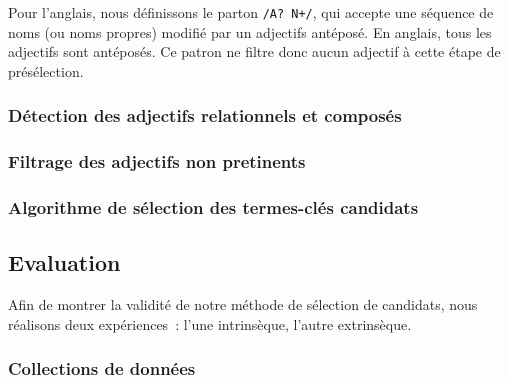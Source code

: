         Pour l'anglais, nous définissons le parton \texttt{/A? N+/}, qui
        accepte une séquence de noms (ou noms propres) modifié par un adjectifs
        antéposé. En anglais, tous les adjectifs sont antéposés. Ce patron ne
        filtre donc aucun adjectif à cette étape de présélection.

      \subsubsection{Détection des adjectifs relationnels et composés}
      \label{subsubsec:main-automatic_keyphrase_annotation-keyphrase_candidate_selection-modifiers_filtering-relational_adjective_detection}

      \subsubsection{Filtrage des adjectifs non pretinents}
      \label{subsubsec:main-automatic_keyphrase_annotation-keyphrase_candidate_selection-modifiers_filtering-adjective_filtering}

      \subsubsection{Algorithme de sélection des termes-clés candidats}
      \label{subsubsec:main-automatic_keyphrase_annotation-keyphrase_candidate_selection-modifiers_filtering-algorithm}

    \subsection{Evaluation}
    \label{subsec:main-automatic_keyphrase_annotation-keyphrase_candidate_selection-evaluation}
      Afin de montrer la validité de notre méthode de sélection de candidats,
      nous réalisons deux expériences~: l'une intrinsèque, l'autre extrinsèque.

      \subsubsection{Collections de données}
      \label{subsubsec:main-automatic_keyphrase_annotation-keyphrase_candidate_selection-evaluation-evaluation_data}
        \TODO{\dots}

